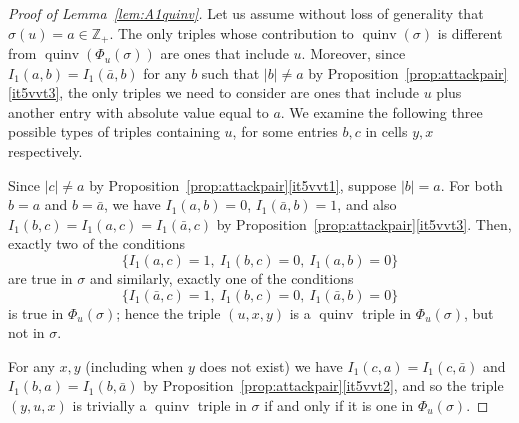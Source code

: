 \documentclass[ALCO,Unicode]{cedram}
\DeclareMathOperator{\quinv}{quinv}
\newcommand\cellL[4]{
\def\i{#1} \def\j{#2} \def\entry{#3} \def\labl{#4}
\draw (\j-1,-\i)--(\j,-\i)--(\j,-\i+1)--(\j-1,-\i+1)--(\j-1,-\i);
\node at (\j-.5,-\i+.5) {\entry};
\node at (\j-1.3,-\i+.8) {\tiny\labl};
}
\begin{document}
\begin{proof}[Proof of Lemma~\ref{lem:A1quinv}]
Let us assume without loss of generality that $\sigma(u)=a\in\mathbb{Z}_+$. The only triples whose contribution to $\quinv(\sigma)$ is different from $\quinv(\Phi_u(\sigma))$ are ones that include $u$. Moreover, since $I_1(a,b)=I_1(\bar{a},b)$ for any $b$ such that $|b| \neq a$ by Proposition~\ref{prop:attackpair}\ref{it5vvt3}, the only triples we need to consider are ones that include $u$ plus another entry with absolute value equal to $a$. We examine the following three possible types of triples containing $u$, for some entries $b,c$ in cells $y,x$ respectively.
\begin{flushleft}
\end{flushleft}
Since $|c|\neq a$ by Proposition~\ref{prop:attackpair}\ref{it5vvt1}, suppose $|b|=a$. For both $b=a$ and $b=\bar{a}$, we have $I_1(a,b)=0$, $I_1(\bar{a},b)=1$, and also $I_1(b,c)=I_1(a,c)=I_1(\bar{a},c)$ by Proposition~\ref{prop:attackpair}\ref{it5vvt3}. Then, exactly two of the conditions
\[\{I_1(a,c)=1,\ I_1(b,c)=0,\  I_1(a,b)=0\}\]
are true in $\sigma$ and similarly, exactly one of the conditions
\[\{I_1(\bar{a},c)=1,\ I_1(b,c)=0,\ I_1(\bar{a},b)=0\}\]
is true in $\Phi_u(\sigma)$; hence the triple $(u,x,y)$ is a $\quinv$ triple in $\Phi_u(\sigma)$, but not in $\sigma$.
\begin{flushleft}
\end{flushleft}
For any $x,y$ (including when $y$ does not exist) we have $I_1(c,a)=I_1(c,\bar{a})$ and $I_1(b,a)=I_1(b,\bar{a})$ by Proposition~\ref{prop:attackpair}\ref{it5vvt2}, and so the triple $(y,u,x)$ is trivially a $\quinv$ triple in $\sigma$ if and only if it is one in $\Phi_u(\sigma)$.


\end{proof}
\end{document}
